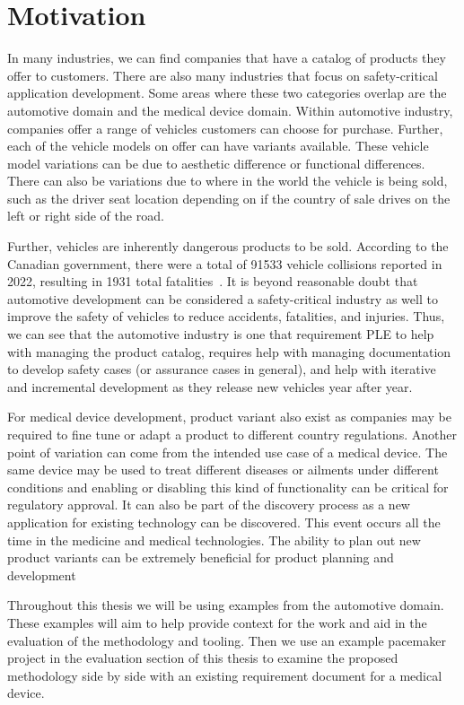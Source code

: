 \section{Motivation}

In many industries, we can find companies that have a catalog of products they offer to customers. There are also many industries that focus on safety-critical application development. Some areas where these two categories overlap are the automotive domain and the medical device domain. Within automotive industry, companies offer a range of vehicles customers can choose for purchase. Further, each of the vehicle models on offer can have variants available. These vehicle model variations can be due to aesthetic difference or functional differences. There can also be variations due to where in the world the vehicle is being sold, such as the driver seat location depending on if the country of sale drives on the left or right side of the road. 

Further, vehicles are inherently dangerous products to be sold. According to the Canadian government, there were a total of 91533 vehicle collisions reported in 2022, resulting in 1931 total fatalities~\cite{CanadaCrashStats}. It is beyond reasonable doubt that automotive development can be considered a safety-critical industry as well to improve the safety of vehicles to reduce accidents, fatalities, and injuries. Thus, we can see that the automotive industry is one that requirement \ac{PLE} to help with managing the product catalog, requires help with managing documentation to develop safety cases (or assurance cases in general), and help with iterative and incremental development as they release new vehicles year after year.

For medical device development, product variant also exist as companies may be required to fine tune or adapt a product to different country regulations. Another point of variation can come from the intended use case of a medical device. The same device may be used to treat different diseases or ailments under different conditions and enabling or disabling this kind of functionality can be critical for regulatory approval. It can also be part of the discovery process as a new application for existing technology can be discovered. This event occurs all the time in the medicine and medical technologies. The ability to plan out new product variants can be extremely beneficial for product planning and development

Throughout this thesis we will be using examples from the automotive domain. These examples will aim to help provide context for the work and aid in the evaluation of the methodology and tooling. Then we use an example pacemaker project in the evaluation section of this thesis to examine the proposed methodology side by side with an existing requirement document for a medical device.

